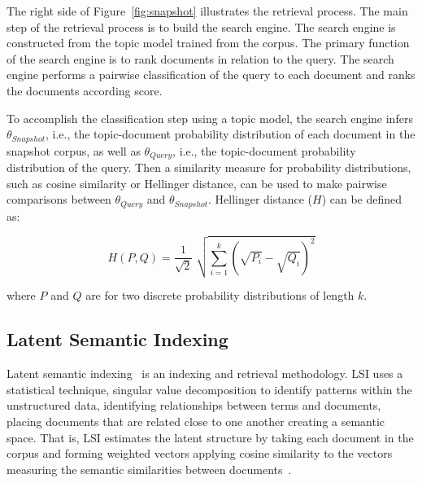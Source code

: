 The right side of Figure~\ref{fig:snapshot} illustrates the retrieval process.
The main step of the retrieval process is to build the search engine.
The search engine is constructed from the topic model trained from the corpus.
The primary function of the search engine is to rank documents in relation to the query.
The search engine performs a pairwise classification of the query
to each document and ranks the documents according score.

To accomplish the classification step using a topic model,
the search engine infers $\theta_{Snapshot}$, i.e.,
the topic-document probability distribution of each document in the snapshot corpus,
as well as $\theta_{Query}$, i.e., the topic-document probability distribution  of the query.
Then a similarity measure for probability distributions, such as 
cosine similarity or Hellinger distance, can be used to make pairwise comparisons
between $\theta_{Query}$ and $\theta_{Snapshot}$.
Hellinger distance ($H$) can be defined as:

\begin{equation}
    H(P, Q) = \frac{1}{\sqrt{2}} \; \sqrt{\sum_{i=1}^{k} (\sqrt{P_i} - \sqrt{Q_i})^2}
\end{equation}

where $P$ and $Q$ are for two discrete probability distributions of length $k$.

\subsection{Latent Semantic Indexing}

Latent semantic indexing~\cite{Deerwester-etal:1990} is an indexing and
retrieval methodology. LSI uses a statistical technique, singular value
decomposition to identify patterns within the unstructured data, identifying
relationships between terms and documents, placing documents that are related
close to one another creating a semantic space. That is, LSI estimates the
latent structure by taking each document in the corpus and forming weighted
vectors applying cosine similarity to the vectors measuring the semantic
similarities between documents~\cite{Binkley-Lawrie:2010}.

